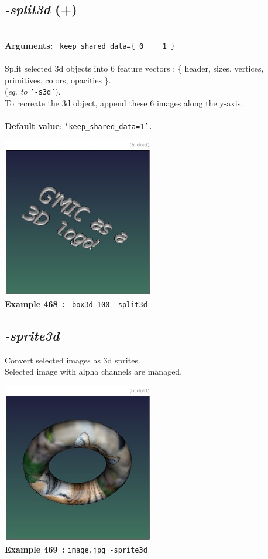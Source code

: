 \documentclass[a4paper,11pt,twoside]{book}
\begin{document}
\subsection{\emph{-split3d} (+)}\vspace*{-0.5em}
~\\\textbf{Arguments: } 
{\small \texttt{\_keep\_shared\_data=\{ 0 ~$|$~ 1 \}}}\\~\\
Split selected 3d objects into 6 feature vectors :
\{ header, sizes, vertices, primitives, colors, opacities \}.
~\\(\emph{eq. to} {\small \texttt{'-s3d'}}).
~\\To recreate the 3d object, append these 6 images along the y-axis.
~\\~\\\textbf{Default value}: {\small \texttt{'keep\_shared\_data=1'.}}
\begin{center}\includegraphics[keepaspectratio=true,height=7cm,width=\textwidth]{img/gmic_def468.jpg}\\
{\footnotesize \textbf{Example 468~:} \texttt{-box3d 100 --split3d}}
\end{center}

\subsection{\emph{-sprite3d} }\vspace*{-0.5em}
Convert selected images as 3d sprites.
~\\Selected image with alpha channels are managed.
\begin{center}\includegraphics[keepaspectratio=true,height=7cm,width=\textwidth]{img/gmic_def469.jpg}\\
{\footnotesize \textbf{Example 469~:} \texttt{image.jpg -sprite3d}}
\end{center}
\end{document}
